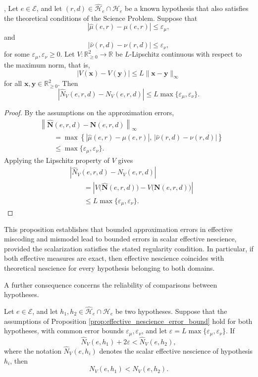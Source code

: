 \begin{proposition}
\label{prop:effective_nescience_error_bound},
Let $e\in\mathcal E$, and let $(r,d)\in\widehat{\mathcal H}_e\cap\mathcal H_e$ be a known hypothesis that also satisfies the theoretical conditions of the Science Problem. Suppose that
\[
\left|\widehat\mu(e,r)-\mu(e,r)\right| \leq\varepsilon_\mu,
\]
and
\[
\left|\widehat\nu(r,d)-\nu(r,d)\right| \leq\varepsilon_\nu,
\]
for some $\varepsilon_\mu,\varepsilon_\nu\geq0$. Let $V:\mathbb R_{\geq0}^2\to\mathbb R$ be $L$-Lipschitz continuous with respect to the maximum norm, that is,
\[
|V(\mathbf x)-V(\mathbf y)| \leq L\|\mathbf x-\mathbf y\|_\infty
\]
for all $\mathbf x,\mathbf y\in\mathbb R_{\geq0}^2$. Then
\[
\left|\widehat N_V(e,r,d)-N_V(e,r,d)\right| \leq L\max\{\varepsilon_\mu,\varepsilon_\nu\}.
\]
\end{proposition}
\begin{proof}
By the assumptions on the approximation errors,
\[
\begin{aligned}
&\left\|\widehat{\mathbf N}(e,r,d)-\mathbf N(e,r,d)\right\|_\infty\\
&\qquad=\max\left\{|\widehat\mu(e,r)-\mu(e,r)|,\,|\widehat\nu(r,d)-\nu(r,d)|\right\}\\
&\qquad\leq\max\{\varepsilon_\mu,\varepsilon_\nu\}.
\end{aligned}
\]
Applying the Lipschitz property of $V$ gives
\[
\begin{aligned}
&\left|\widehat N_V(e,r,d)-N_V(e,r,d)\right|\\
&\qquad=\left|V\bigl(\widehat{\mathbf N}(e,r,d)\bigr)-V\bigl(\mathbf N(e,r,d)\bigr)\right|\\
&\qquad\leq L\max\{\varepsilon_\mu,\varepsilon_\nu\}.
\end{aligned}
\]
\end{proof}

This proposition establishes that bounded approximation errors in effective miscoding and mismodel lead to bounded errors in scalar effective nescience, provided the scalarization satisfies the stated regularity condition. In particular, if both effective measures are exact, then effective nescience coincides with theoretical nescience for every hypothesis belonging to both domains.

A further consequence concerns the reliability of comparisons between hypotheses.

\begin{proposition}
\label{prop:effective_nescience_ranking}
Let $e\in\mathcal E$, and let $h_1,h_2\in\widehat{\mathcal H}_e\cap\mathcal H_e$ be two hypotheses. Suppose that the assumptions of Proposition \ref{prop:effective_nescience_error_bound} hold for both hypotheses, with common error bounds $\varepsilon_\mu,\varepsilon_\nu$, and let $\varepsilon = L\max\{\varepsilon_\mu,\varepsilon_\nu\}$. If
\[
\widehat N_V(e,h_1)+2\varepsilon < \widehat N_V(e,h_2),
\]
where the notation $\widehat N_V(e,h_i)$ denotes the scalar effective nescience of hypothesis $h_i$, then
\[
N_V(e,h_1)<N_V(e,h_2).
\]
\end{proposition}

